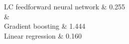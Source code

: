 \begin{frame}[t]
\begin{columns}[t]
\begin{column}{.42\textwidth}
\begin{table}[h!]
\begin{tabular}{L{\ocwa}C{\ocwd}}
                    feedforward neural network	                & 0.255                                                             \\
                     &             \\
                    Gradient boosting 		                    & 1.444                                                             \\
                    Linear regression 		                    & 0.160                                                             \\ \bottomrule
                \end{tabular}
            \end{table}
        \end{column}
		\begin{column}{.5\textwidth} %
		\end{column}
	
	\end{columns}
	\vspace{-3em}
\end{frame}
